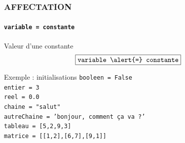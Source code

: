 \begin{frame}
\frametitle{\uppercase{Affectation}}
\framesubtitle{\tt variable \alert{=} constante}
\begin{block}{Valeur d'une constante}
$$\framebox{\tt variable \alert{=} constante}$$
\end{block}
\begin{block}{Exemple : initialisations}
\tt booleen \alert{=} False\\%
\tt entier \alert{=} 3\\%
\tt reel \alert{=} 0.0\\%
\tt chaine \alert{=} "salut"\\%
autreChaine \alert{=} 'bonjour, comment ça va ?'\\%
\tt tableau \alert{=} [5,2,9,3]\\%
\tt matrice \alert{=} [[1,2],[6,7],[9,1]]
\end{block}

\end{frame}


